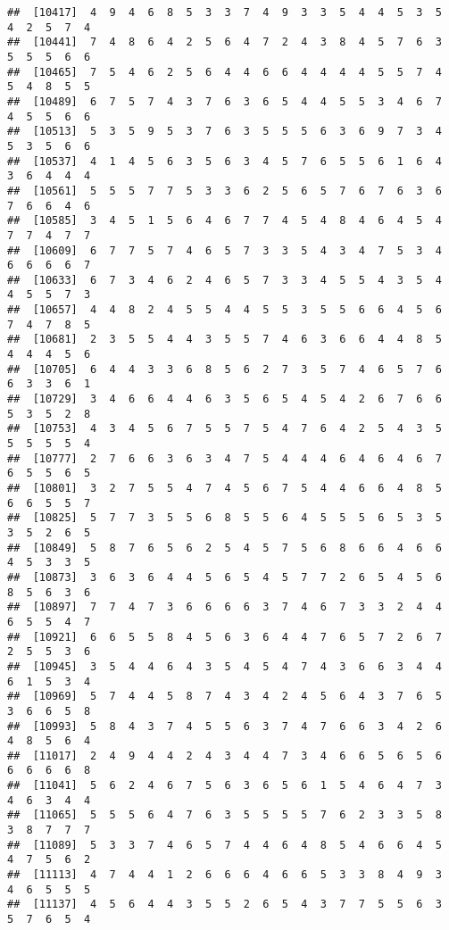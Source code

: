 \documentclass[
]{book}
\begin{document}
\begin{verbatim}
##  [10417]  4  9  4  6  8  5  3  3  7  4  9  3  3  5  4  4  5  3  5  4  2  5  7  4
##  [10441]  7  4  8  6  4  2  5  6  4  7  2  4  3  8  4  5  7  6  3  5  5  5  6  6
##  [10465]  7  5  4  6  2  5  6  4  4  6  6  4  4  4  4  5  5  7  4  5  4  8  5  5
##  [10489]  6  7  5  7  4  3  7  6  3  6  5  4  4  5  5  3  4  6  7  4  5  5  6  6
##  [10513]  5  3  5  9  5  3  7  6  3  5  5  5  6  3  6  9  7  3  4  5  3  5  6  6
##  [10537]  4  1  4  5  6  3  5  6  3  4  5  7  6  5  5  6  1  6  4  3  6  4  4  4
##  [10561]  5  5  5  7  7  5  3  3  6  2  5  6  5  7  6  7  6  3  6  7  6  6  4  6
##  [10585]  3  4  5  1  5  6  4  6  7  7  4  5  4  8  4  6  4  5  4  7  7  4  7  7
##  [10609]  6  7  7  5  7  4  6  5  7  3  3  5  4  3  4  7  5  3  4  6  6  6  6  7
##  [10633]  6  7  3  4  6  2  4  6  5  7  3  3  4  5  5  4  3  5  4  4  5  5  7  3
##  [10657]  4  4  8  2  4  5  5  4  4  5  5  3  5  5  6  6  4  5  6  7  4  7  8  5
##  [10681]  2  3  5  5  4  4  3  5  5  7  4  6  3  6  6  4  4  8  5  4  4  4  5  6
##  [10705]  6  4  4  3  3  6  8  5  6  2  7  3  5  7  4  6  5  7  6  6  3  3  6  1
##  [10729]  3  4  6  6  4  4  6  3  5  6  5  4  5  4  2  6  7  6  6  5  3  5  2  8
##  [10753]  4  3  4  5  6  7  5  5  7  5  4  7  6  4  2  5  4  3  5  5  5  5  5  4
##  [10777]  2  7  6  6  3  6  3  4  7  5  4  4  4  6  4  6  4  6  7  6  5  5  6  5
##  [10801]  3  2  7  5  5  4  7  4  5  6  7  5  4  4  6  6  4  8  5  6  6  5  5  7
##  [10825]  5  7  7  3  5  5  6  8  5  5  6  4  5  5  5  6  5  3  5  3  5  2  6  5
##  [10849]  5  8  7  6  5  6  2  5  4  5  7  5  6  8  6  6  4  6  6  4  5  3  3  5
##  [10873]  3  6  3  6  4  4  5  6  5  4  5  7  7  2  6  5  4  5  6  8  5  6  3  6
##  [10897]  7  7  4  7  3  6  6  6  6  3  7  4  6  7  3  3  2  4  4  6  5  5  4  7
##  [10921]  6  6  5  5  8  4  5  6  3  6  4  4  7  6  5  7  2  6  7  2  5  5  3  6
##  [10945]  3  5  4  4  6  4  3  5  4  5  4  7  4  3  6  6  3  4  4  6  1  5  3  4
##  [10969]  5  7  4  4  5  8  7  4  3  4  2  4  5  6  4  3  7  6  5  3  6  6  5  8
##  [10993]  5  8  4  3  7  4  5  5  6  3  7  4  7  6  6  3  4  2  6  4  8  5  6  4
##  [11017]  2  4  9  4  4  2  4  3  4  4  7  3  4  6  6  5  6  5  6  6  6  6  6  8
##  [11041]  5  6  2  4  6  7  5  6  3  6  5  6  1  5  4  6  4  7  3  4  6  3  4  4
##  [11065]  5  5  5  6  4  7  6  3  5  5  5  5  7  6  2  3  3  5  8  3  8  7  7  7
##  [11089]  5  3  3  7  4  6  5  7  4  4  6  4  8  5  4  6  6  4  5  4  7  5  6  2
##  [11113]  4  7  4  4  1  2  6  6  6  4  6  6  5  3  3  8  4  9  3  4  6  5  5  5
##  [11137]  4  5  6  4  4  3  5  5  2  6  5  4  3  7  7  5  5  6  3  5  7  6  5  4

\end{verbatim}
\end{document}
